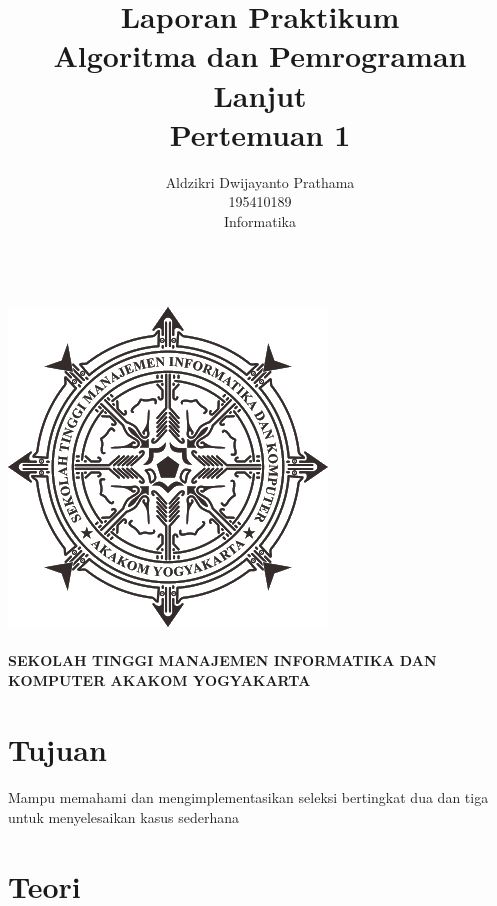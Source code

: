 \documentclass[a4paper,12pt]{article}
\begin{document}
\title{ {\Large Laporan Praktikum}\\ Algoritma dan Pemrograman Lanjut\\{\Large Pertemuan 1}}

\author{Aldzikri Dwijayanto Prathama 
	\\195410189
	\\Informatika}
\makeatletter
\begin{titlepage}
	\begin{center}
		{\huge \bfseries \@title }\\[14ex]
		\includegraphics[scale=.8]{logo}\\[4ex]
		{\large \@author}\\[12ex]
		{\large \bfseries {SEKOLAH TINGGI MANAJEMEN INFORMATIKA DAN KOMPUTER
				AKAKOM YOGYAKARTA}}
	\end{center}


\end{titlepage}
\makeatother
\newpage
\tableofcontents
\newpage

\section{Tujuan}
\paragraph{}
Mampu memahami dan mengimplementasikan seleksi bertingkat dua dan tiga untuk
menyelesaikan kasus sederhana

\section{Teori}
\end{document}
